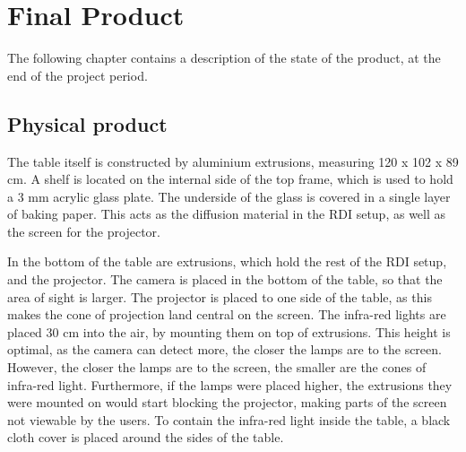 \chapter{Final Product}\label{ch:finproduct}
The following chapter contains a description of the state of the product, at the end of the project period.

\section{Physical product}
The table itself is constructed by aluminium extrusions, measuring 120 x 102 x 89 cm. A shelf is located on the internal side of the top frame, which is used to hold a 3 mm acrylic glass plate. The underside of the glass is covered in a single layer of baking paper. This acts as the diffusion material in the RDI setup, as well as the screen for the projector.

In the bottom of the table are extrusions, which hold the rest of the RDI setup, and the projector. The camera is placed in the bottom of the table, so that the area of sight is larger. The projector is placed to one side of the table, as this makes the cone of projection land central on the screen. The infra-red lights are placed 30 cm into the air, by mounting them on top of extrusions. This height is optimal, as the camera can detect more, the closer the lamps are to the screen. However, the closer the lamps are to the screen, the smaller are the cones of infra-red light.  Furthermore, if the lamps were placed higher, the extrusions they were mounted on would start blocking the projector, making parts of the screen not viewable by the users. To contain the infra-red light inside the table, a black cloth cover is placed around the sides of the table.



